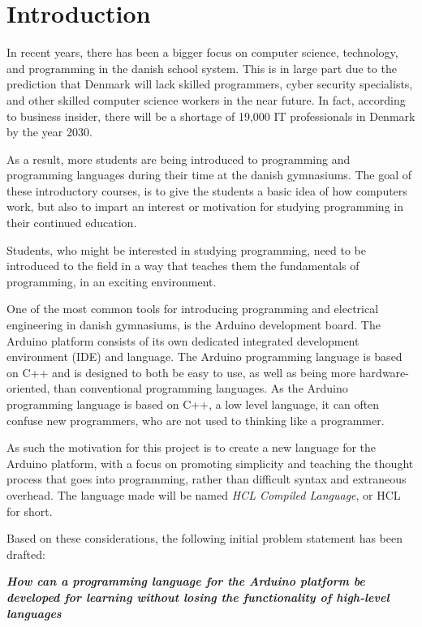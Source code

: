 \chapter{Introduction}
In recent years, there has been a bigger focus on computer science, technology, and programming in the danish school system.
This is in large part due to the prediction that Denmark will lack skilled programmers, cyber security specialists, and other skilled computer science workers in the near future.
In fact, according to business insider, there will be a shortage of 19,000 IT professionals in Denmark by the year 2030\cite{ITLackDK}.

As a result, more students are being introduced to programming and programming languages during their time at the
danish gymnasiums. 
The goal of these introductory courses, is to give the students a basic idea of how computers work, but also to impart an interest or motivation for studying programming in their continued education.

Students, who might be interested in studying programming, need to be introduced to the field in a way that teaches them the fundamentals of programming, in an exciting environment.

One of the most common tools for introducing programming and electrical engineering in danish gymnasiums, is the Arduino development board. 
The Arduino platform consists of its own dedicated integrated development environment (IDE) and language.
The Arduino programming language is based on C++ and is designed to both be easy to use, as well as being more hardware-oriented, than conventional programming languages\cite{ArFAQ}.
As the Arduino programming language is based on C++, a low level language, it can often confuse new programmers, who are not used to thinking like a programmer.

As such the motivation for this project is to create a new language for the Arduino platform, with a focus on promoting simplicity and teaching the thought process that goes into programming, rather than difficult syntax and extraneous overhead.
The language made will be named \textit{HCL Compiled Language}, or HCL for short.

Based on these considerations, the following initial problem statement has been drafted:

\begin{center}
	\textit{\textbf{How can a programming language for the Arduino platform be developed for learning without losing the functionality of high-level languages}}
\end{center}
